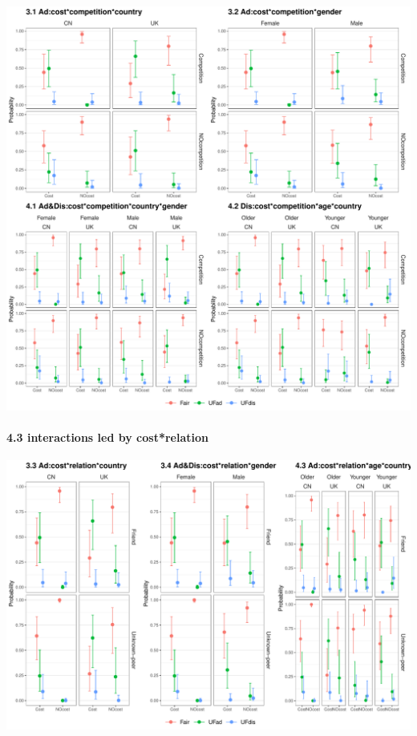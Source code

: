 \documentclass[
]{article}
\begin{document}
\includegraphics{Registration_The-Dynamic-Cost-Model_files/figure-latex/plot 4.2-1.pdf}

\hypertarget{interactions-led-by-costrelation}{%
\paragraph{4.3 interactions led by
cost*relation}\label{interactions-led-by-costrelation}}

\includegraphics{Registration_The-Dynamic-Cost-Model_files/figure-latex/plot 4.3-1.pdf}
\end{document}
